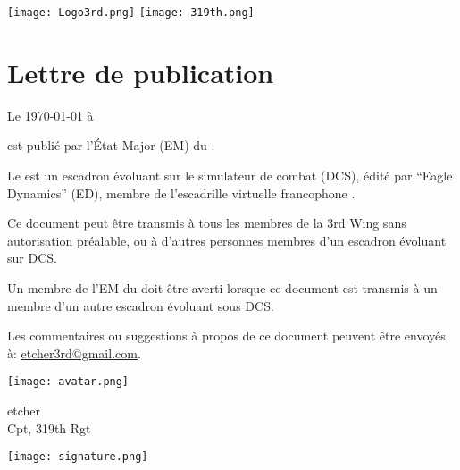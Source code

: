 \fancyhf{}
\renewcommand{\headrulewidth}{0pt}%

\texttt{[image: Logo3rd.png]} \hfill \texttt{[image: 319th.png]}



\section*{Lettre de publication}

\vfill

Le \today{} à \currenttime{}

\vfill

\docname{} est publié par l’État Major (EM) du \rgt{}.

Le \rgt{} est un escadron évoluant sur le simulateur de combat \dcs{} (DCS), édité par ``Eagle Dynamics'' (ED), membre de l’escadrille virtuelle francophone \thirdwing{}.


Ce document peut être transmis à tous les membres de la 3rd Wing sans autorisation préalable, ou à d’autres personnes membres d’un escadron évoluant sur DCS.

Un membre de l’EM du \rgt{} doit être averti lorsque ce document est transmis à un membre d’un autre escadron évoluant sous DCS.

Les commentaires ou suggestions à propos de ce document peuvent être envoyés à: \href{mailto:etcher3rd@gmail.com}{etcher3rd@gmail.com}.

\vfill

\begin{flushright}
    \hfill \parbox{0.3\textwidth}{\raggedright \hfill \texttt{[image: avatar.png]}} \hfil \parbox{0.4\textwidth}{\raggedright etcher \\ Cpt, 319th Rgt \\ \inmem{}} 
\vfill
\hfill \parbox{0.3\textwidth}{\raggedright \hfill } \hfil \parbox{0.4\textwidth}%
{\centering \texttt{[image: signature.png]}\par}%
\end{flushright}

\vfill 
